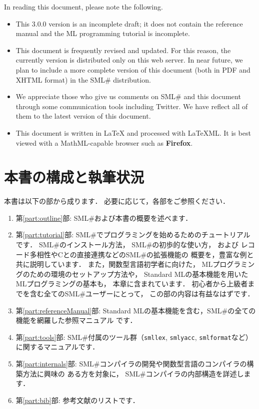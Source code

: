 \documentclass{jbook}
\newcommand{\txt}[2]{#1}
\newcommand{\smlsharp}{SML\#}
\newcommand{\version}{3.0.0}
\begin{document}
In reading this document, please note the following.
\begin{itemize}
\item 
	This \version{} version is an incomplete draft; it does not
contain the reference manual and the ML programming tutorial is
incomplete.

\item 
	This document is frequently revised and updated.
	For this reason, the currently version is distributed only on
this web server.
	In near future, we plan to include a more complete version of
this document (both in PDF and XHTML format) in the \smlsharp{}
distribution.

\item
	We appreciate those who give us comments on \smlsharp{} and
this document through some communication tools including Twitter.
	We have reflect all of them to the latest version of this
document.

\item 
	This document is written in LaTeX and processed with LaTeXML.
	It is best viewed with a MathML-capable browser such as {\bf Firefox}.
\end{itemize}
\fi%

\chapter{\txt{本書の構成と執筆状況}{The structure and status of this document}}

	本書は以下の部から成ります．
	必要に応じて，各部をご参照ください．
\begin{enumerate}
\item
	第\ref{part:outline}部: \smlsharp{}および本書の概要を述べます．
\item
	第\ref{part:tutorial}部:
\smlsharp{}でプログラミングを始めるためのチュートリアルです．
	\smlsharp{}のインストール方法，
\smlsharp{}の初歩的な使い方，
および
レコード多相性やCとの直接連携などの\smlsharp{}の拡張機能の
概要を，豊富な例と共に説明しています．
	また，関数型言語初学者に向けた，
MLプログラミングのための環境のセットアップ方法や，
Standard MLの基本機能を用いたMLプログラミングの基本も，
本章に含まれています．
	初心者から上級者までを含む全ての\smlsharp{}ユーザーにとって，
この部の内容は有益なはずです．
\item
	第\ref{part:referenceManual}部:
Standard MLの基本機能を含む，\smlsharp{}の全ての機能を網羅した参照マニュアル
です．
\item
	第\ref{part:tools}部:
\smlsharp{}付属のツール群（{\tt smllex}, {\tt smlyacc}, {\tt smlformat}など）
に関するマニュアルです．
\item
	第\ref{part:internals}部:
\smlsharp{}コンパイラの開発や関数型言語のコンパイラの構築方法に興味の
ある方を対象に，
\smlsharp{}コンパイラの内部構造を詳述します．
\item
	第\ref{part:bib}部: 参考文献のリストです．
\end{enumerate}
\end{document}
